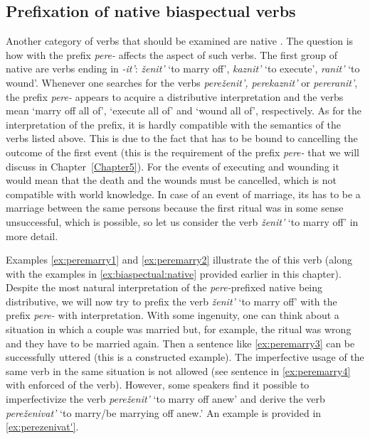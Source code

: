 \subsection{Prefixation of native biaspectual verbs}\label{subsection:perf:native}
Another category of verbs that should be examined are native . The question is how  with the  prefix \textit{pere-} affects the aspect of such verbs. The first group of native  are verbs ending in \textit{-it'}: \textit{\v{z}enit'} `to marry off', \textit{kaznit'} `to execute', \textit{ranit'} `to wound'. Whenever one searches for the verbs \textit{pere\v{z}enit', perekaznit'} or \textit{pereranit'}, the prefix \textit{pere-} appears to acquire a distributive interpretation and the verbs mean `marry off all of', `execute all of' and `wound all of', respectively. As for the  interpretation of the prefix, it is hardly compatible with the semantics of the verbs listed above. This is due to the fact that  has to be bound to cancelling the outcome of the first event (this is the requirement of the prefix \textit{pere-} that we will discuss in Chapter~\ref{Chapter5}). For the events of executing and wounding it would mean that the death and the wounds must be cancelled, which is not compatible with world knowledge. In case of an event of marriage, its  has to be a marriage between the same persons because the first ritual was in some sense unsuccessful, which is possible, so let us consider the verb \textit{\v{z}enit'} `to marry off' in more detail. 

Examples \ref{ex:peremarry1} and \ref{ex:peremarry2} illustrate the  of this verb (along with the examples in \ref{ex:biaspectual:native} provided earlier in this chapter). Despite the most natural interpretation of the \textit{pere-}prefixed native  being distributive, we will now try to prefix the verb \textit{\v{z}enit'} `to marry off' with the prefix \textit{pere-} with  interpretation. With some ingenuity, one can think about a situation in which a couple was married but, for example, the ritual was wrong and they have to be married again. Then a sentence like \ref{ex:peremarry3} can be successfully uttered (this is a constructed example). The imperfective usage of the same verb in the same situation is not allowed (see sentence in \ref{ex:peremarry4} with enforced  of the verb). However, some speakers find it possible to imperfectivize the verb \textit{pere\v{z}enit'} `to marry off anew' and derive the verb \textit{pere\v{z}enivat'} `to marry/be marrying off anew.' An example is provided in \ref{ex:perezenivat'}. 


